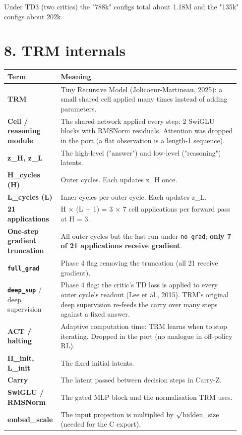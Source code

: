 \documentclass[11pt]{article}
\begin{document}
Under TD3 (two critics) the "788k" configs total about 1.18M and the "135k" configs about 202k.



\section*{8. TRM internals}



\begin{center}\small\begin{tabular}{>{\raggedright\arraybackslash}p{0.179\linewidth}>{\raggedright\arraybackslash}p{0.755\linewidth}}
\toprule
Term & Meaning \\
\midrule
\textbf{TRM} & Tiny Recursive Model (Jolicoeur-Martineau, 2025): a small shared cell applied many times instead of adding parameters. \\
\textbf{Cell / reasoning module} & The shared network applied every step: 2 SwiGLU blocks with RMSNorm residuals. Attention was dropped in the port (a flat observation is a length-1 sequence). \\
\textbf{z\_H, z\_L} & The high-level ("answer") and low-level ("reasoning") latents. \\
\textbf{H\_cycles (H)} & Outer cycles. Each updates z\_H once. \\
\textbf{L\_cycles (L)} & Inner cycles per outer cycle. Each updates z\_L. \\
\textbf{21 applications} & H $\times$ (L + 1) = 3 $\times$ 7 cell applications per forward pass at H = 3. \\
\textbf{One-step gradient truncation} & All outer cycles but the last run under \texttt{no\_grad}; \textbf{only 7 of 21 applications receive gradient}. \\
\textbf{\texttt{full\_grad}} & Phase 4 flag removing the truncation (all 21 receive gradient). \\
\textbf{\texttt{deep\_sup}} / deep supervision & Phase 4 flag: the critic's TD loss is applied to every outer cycle's readout (Lee et al., 2015). TRM's original deep supervision re-feeds the carry over many steps against a fixed answer. \\
\textbf{ACT / halting} & Adaptive computation time: TRM learns when to stop iterating. Dropped in the port (no analogue in off-policy RL). \\
\textbf{H\_init, L\_init} & The fixed initial latents. \\
\textbf{Carry} & The latent passed between decision steps in Carry-Z. \\
\textbf{SwiGLU / RMSNorm} & The gated MLP block and the normalisation TRM uses. \\
\textbf{embed\_scale} & The input projection is multiplied by $\surd$hidden\_size (needed for the C export). \\
\bottomrule
\end{tabular}\end{center}
\end{document}
